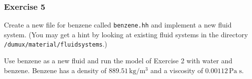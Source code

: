\subsubsection{Exercise 5}
Create a new file for benzene called \texttt{benzene.hh} and implement
a new fluid system. (You may get a hint by looking at existing fluid 
systems in the directory \verb+/dumux/material/fluidsystems+.)

Use benzene as a new fluid and run the model of Exercise 2 with water
and benzene. Benzene has a density of $889.51 \, \text{kg} / \text{m}^3$
and a viscosity of $0.00112 \, \text{Pa} \; \text{s}$. 

